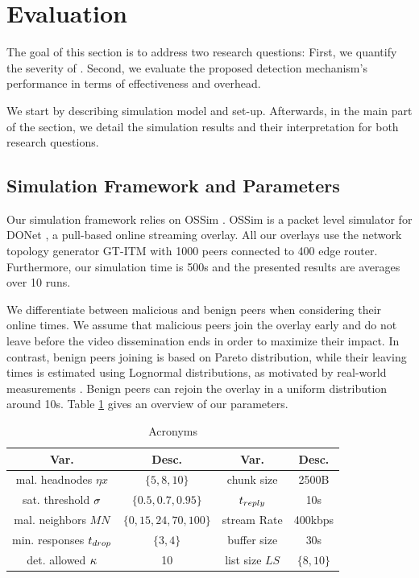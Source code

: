 \section{Evaluation}
\label{sec:eval}

The goal of this section is to address two research questions: 
First, we quantify the severity of \drop. 
Second, we evaluate the proposed detection mechanism's performance in terms of effectiveness and overhead. 

We start by describing simulation model and set-up. 
Afterwards, in the main part of the section, we detail the simulation results and their interpretation for both research questions.

\subsection{Simulation Framework and Parameters}
Our simulation framework relies on OSSim \cite{nguyen2013ossim}. 
OSSim is a packet level simulator for DONet \cite{zhang2005coolstreaming}, a pull-based online streaming overlay.
All our overlays use the network topology generator GT-ITM \cite{GT} with 1000 peers connected to 400 edge router. Furthermore, our simulation time is 500s and the presented results are averages over 10 runs. 

We differentiate between malicious and benign peers when considering their online times. 
We assume that malicious peers join the overlay early and do not leave before the video dissemination ends in order to maximize their impact. 
In contrast,  benign peers joining is based on Pareto distribution, while their leaving times is estimated using Lognormal distributions, as motivated by real-world measurements \cite{distribution}.
Benign peers can rejoin the overlay in a uniform distribution around 10s.
Table \ref{tab:parameters} gives an overview of our parameters. 

\begin{table}[ht]
\center
\caption{Acronyms}
\begin{tabular}{|c|c||c|c|}
\hline

\bf{Var.} & \bf{Desc.}  & \bf{Var.} & \bf{Desc.} \\\hline\hline

mal. headnodes $\eta x$ & $\{5,8,10\}$ & chunk size & 2500B \\\hline
sat. threshold $\sigma$ & $\{0.5,0.7,0.95\}$ & $t_{reply}$ & 10s\\\hline
mal. neighbors $MN$  & $\{0,15,24,70,100\}$ & stream Rate & 400kbps\\\hline
min. responses $t_{drop}$ &  $\{3,4\}$ & buffer size & 30s  \\\hline
det. allowed $\kappa$ & 10 & list size $LS$ & $\{8,10\}$\\\hline
  
\end{tabular}
\label{tab:parameters}
\end{table}
\vspace{-2.5mm}
